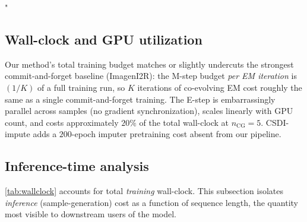"\documentclass{article}
\theoremstyle{plain}
\theoremstyle{definition}
\theoremstyle{remark}
\begin{document}
\subsection{Wall-clock and GPU utilization}
\label{app:wallclock}

\begin{table}[h]
\centering
\caption{Total training wall-clock (Energy $50\%$, single A100). Comparable budgets confirm iteration---not extra compute---is responsible for the quality gain.}
\label{tab:wallclock}
\end{table}

Our method's total training budget matches or slightly undercuts the strongest commit-and-forget baseline (ImagenI2R): the M-step budget \emph{per EM iteration} is $(1/K)$ of a full training run, so $K$ iterations of co-evolving EM cost roughly the same as a single commit-and-forget training. The E-step is embarrassingly parallel across samples (no gradient synchronization), scales linearly with GPU count, and costs approximately $20\%$ of the total wall-clock at $n_{\mathrm{CG}} = 5$. CSDI-impute adds a $200$-epoch imputer pretraining cost absent from our pipeline.

\subsection{Inference-time analysis}
\label{app:inference-time}

\cref{tab:wallclock} accounts for total \emph{training} wall-clock. This subsection isolates \emph{inference} (sample-generation) cost as a function of sequence length, the quantity most visible to downstream users of the model.
\end{document}
